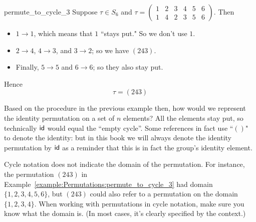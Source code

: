 \begin{example}{permute_to_cycle_3}
Suppose $\tau \in S_6$ and $\tau  = \begin{pmatrix} 1 & 2 & 3 & 4 & 5 & 6 \\ 1 & 4 & 2 & 3 & 5 & 6 \end{pmatrix}$.  Then
\begin{itemize}
\item
$1 \to 1$, which means that $1$ ``stays put."  So we don't use $1$.
\item
$2 \to 4$, $4 \to 3$, and $3 \to 2$; so we have $(243)$.
\item
Finally, $5 \to 5$ and $6 \to 6$; so they also stay put.
\end{itemize}
Hence 
\[
\tau = (243) \]
\end{example}

Based on the procedure in the previous example then, how would we represent the identity permutation on a set of $n$ elements?  All the elements stay put, so technically ${\sf{i}d}$ would equal the ``empty cycle''.  Some references in fact use  ``$()$" to denote the identity: but in this book we will always denote
the identity permutation  by ${\sf{i}d}$ as a reminder that this is in fact the group's identity element.

\begin{warn}\label{cycle_domain}
Cycle notation does not indicate the domain of the permutation. For instance, the permutation $(243)$ in Example~\ref{example:Permutations:permute_to_cycle_3} had domain $\{1,2,3,4,5,6\}$, but  $(243)$ could also refer to a permutation on the domain $\{1,2,3,4\}$. When working with permutations in cycle notation, make sure you know what the domain is. (In most cases, it's clearly specified by the context.)
\end{warn}

